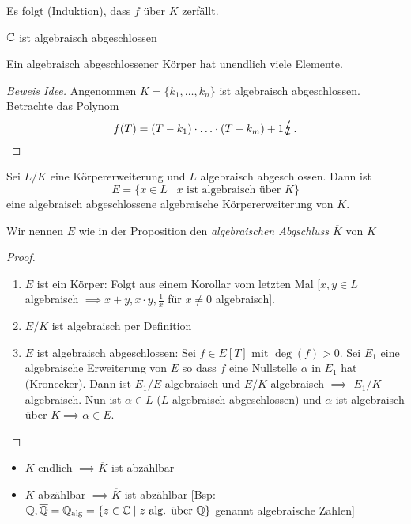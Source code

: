 Es folgt (Induktion), dass $f$ über $K$ zerfällt.
\begin{eg}
	$\mathbb{C}$ ist algebraisch abgeschlossen
\end{eg}

\begin{remark}
	Ein algebraisch abgeschlossener Körper hat unendlich viele Elemente.
	\begin{proof}[Beweis Idee]
		Angenommen $K = \{k_1,\ldots,k_{n}\}$ ist algebraisch abgeschlossen. Betrachte das Polynom
		\[
			f(T) = (T-k_1) \cdot \ldots \cdot (T-k_{m}) + 1 \contra
		.\] 
	\end{proof}
\end{remark}

\begin{proposition}
	Sei $L / K$ eine Körpererweiterung und $L$ algebraisch abgeschlossen.
	Dann ist 
	\[
		E = \{x \in L \mid x \text{ ist algebraisch über } K\}
	\]
	eine algebraisch abgeschlossene algebraische Körpererweiterung von $K$.
\end{proposition}

\begin{definition}
	Wir nennen $E$ wie in der Proposition den \emph{algebraischen Abgschluss $\overline{K}$ } von $K$
\end{definition}

\begin{proof}
	\begin{enumerate}[(1)]
		\item $E$ ist ein Körper: Folgt aus einem Korollar vom letzten Mal [$x,y \in L$ algebraisch $\implies x+y,x\cdot y,\frac{1}{x}$ für $x \neq 0$ algebraisch].
		\item   $E / K$ ist algebraisch per Definition
		\item $E$ ist algebraisch abgeschlossen: Sei $f \in E[T]$ mit $\deg(f) > 0$. Sei $E_1$ eine algebraische Erweiterung von $E$ so dass
			$f$ eine Nullstelle $\alpha$ in $E_1$ hat (Kronecker). Dann ist $E_1 / E$ algebraisch und $E / K$ algebraisch $\implies$ $E_1 / K$ algebraisch.
			Nun ist $\alpha \in L$ ($L$ algebraisch abgeschlossen) und $\alpha$ ist algebraisch über $K \implies \alpha \in E$.
	\end{enumerate}
\end{proof}

\begin{remark}
	\begin{itemize}
		\item $K$ endlich $\implies \overline{K}$ ist abzählbar
		\item $K$ abzählbar $\implies \overline{K}$ ist abzählbar [Bsp: $\mathbb{Q}, \overline{\mathbb{Q}} = \mathbb{Q}_{\operatorname{alg}} = \{z \in \mathbb{C} \mid z \text{ alg. über } \mathbb{Q}\}$ genannt algebraische Zahlen]
	\end{itemize}
\end{remark}

